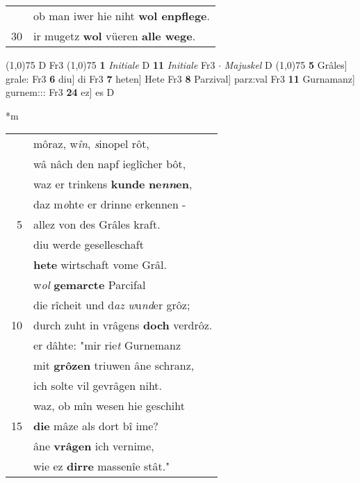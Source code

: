 \documentclass[8pt,a4paper,notitlepage]{article}
\begin{document}
\begin{table}[ht]
\begin{minipage}[t]{0.5\linewidth}
\begin{tabular}{rl}
 & ob man iwer hie niht \textbf{wol enpflege}.\\ 
30 & ir mugetz \textbf{wol} vüeren \textbf{alle wege}.\\ 
\end{tabular}
\scriptsize
\line(1,0){75} \newline
D Fr3 \newline
\line(1,0){75} \newline
\textbf{1} \textit{Initiale} D  \textbf{11} \textit{Initiale} Fr3   $\cdot$ \textit{Majuskel} D  \newline
\line(1,0){75} \newline
\textbf{5} Grâles] grale: Fr3 \textbf{6} diu] di Fr3 \textbf{7} heten] Hete Fr3 \textbf{8} Parzival] parz:val Fr3 \textbf{11} Gurnamanz] gurnem::: Fr3 \textbf{24} ez] es D \newline
\end{minipage}
\hspace{0.5cm}
\begin{minipage}[t]{0.5\linewidth}
\small
\begin{center}*m
\end{center}
\begin{tabular}{rl}
 & môraz, w\textit{în}, \textit{s}inopel rôt,\\ 
 & wâ nâch den napf ieglîcher bôt,\\ 
 & waz er trinkens \textbf{kunde} \textbf{ne\textit{nn}en},\\ 
 & daz m\textit{o}hte er drinne erkennen -\\ 
5 & allez von des Grâles kraft.\\ 
 & diu werde geselleschaft\\ 
 & \textbf{hete} wirtschaft vome Grâl.\\ 
 & w\textit{ol} \textbf{gemarcte} Parcifal\\ 
 & die rîcheit und d\textit{az} \textit{w}u\textit{nd}er grôz;\\ 
10 & durch zuht in vrâgens \textbf{doch} verdrôz.\\ 
 & er dâhte: "mir rie\textit{t} Gurnemanz\\ 
 & mit \textbf{grôzen} triuwen âne schranz,\\ 
 & ich solte vil gevrâgen niht.\\ 
 & waz, ob mîn wesen hie geschiht\\ 
15 & \textbf{die} mâze als dort bî ime?\\ 
 & âne \textbf{vrâgen} ich vernime,\\ 
 & wie ez \textbf{dirre} massenîe stât."\\ 

\end{tabular}
\end{minipage}
\end{table}
\end{document}
